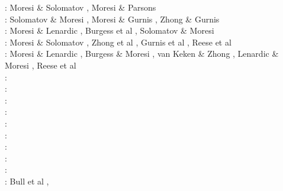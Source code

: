 \begin{itemize}
\begin{scriptsize}
\nineteenninetyfive: Moresi \& Solomatov \cite{moso95}, Moresi \& Parsons \cite{mopa95}\\
\nineteenninetysix: Solomatov \& Moresi \cite{somo96}, Moresi \& Gurnis \cite{mogu96}, Zhong \& Gurnis \cite{zhgu96}\\
\nineteenninetyseven: Moresi \& Lenardic \cite{mole97}, Burgess et al \cite{bugm97}, Solomatov \& Moresi \cite{somo97}\\
\nineteenninetyeight: Moresi \& Solomatov \cite{moso98}, Zhong et al \cite{zhgm98}, Gurnis et al \cite{gumm98}, Reese et al \cite{resm98}\\
\nineteenninetynine: Moresi \& Lenardic \cite{mole99}, Burgess \& Moresi \cite{bumo99}, van Keken \& Zhong \cite{vazh99},
                     Lenardic \& Moresi \cite{lemo99}, Reese et al \cite{resm99}\\
\twothousand: \cite{zhzm00}\cite{gumr00}\cite{lemm00}\cite{gumm00}\cite{somo00}\\
\twothousandone: \cite{bigu01}\cite{lemo01}\cite{zhon01}\\
\twothousandtwo: \cite{tagh02}\cite{somo02}\\
\twothousandthree: \cite{vazh03}\cite{cogu03}\cite{bigu03}\cite{lemm03}\cite{lemo03}\cite{bigs03}\cite{vesh03}\\
\twothousandfour: \cite{solo04}\cite{frmm04}\cite{lenm04}\cite{colm04}\cite{mczh04}\\
\twothousandfive: \cite{bihi05}\cite{mczh05a}\cite{mczh05b}\cite{lemj05}\cite{zhon05}\\
\twothousandsix: \cite{beck06}\cite{pibf06}\cite{tact06}\cite{besb06}\cite{coli06}\cite{frmm06}\cite{colm06}
      \cite{zhon06}\cite{keso06}\cite{rozh06}\cite{zhpy06}\\
\twothousandseven: \cite{bihi07}\cite{zhzl07}\cite{magu07}\cite{bavi07}\cite{rimb07}\cite{mofm07}\cite{cobs07}
      \cite{qums07}\cite{huda07}\cite{rozh07}\\
\twothousandeight: \cite{dihf08}\cite{gamc08}\cite{zhmt08}\cite{hole08}\cite{lejm08}\cite{lisg08}\cite{chzy08}
      \cite{beke08}\cite{beck08}\cite{slee08}\cite{lezh08}\cite{king08}\cite{ligu08}\cite{meco08}
      \cite{roni08}\cite{splg08}\cite{divf08}\cite{vavg08}\\
\twothousandnine: Bull et al \cite{bumr09}, \cite{lizh09}\cite{arhm09}\cite{zhzm09}\cite{anbi09}\cite{fobe09}\cite{bubi09}\cite{befa09}
      \cite{bavi09}\cite{lezh09}\cite{bogj09}\cite{zhon09}\cite{cohu09}\cite{coco09}\cite{keso09}

\end{scriptsize}
\end{itemize}
